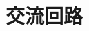 \documentclass[../../../all/physics-standard_answers_all.tex]{subfiles}
\begin{document}
\section{交流回路}
\end{document}
